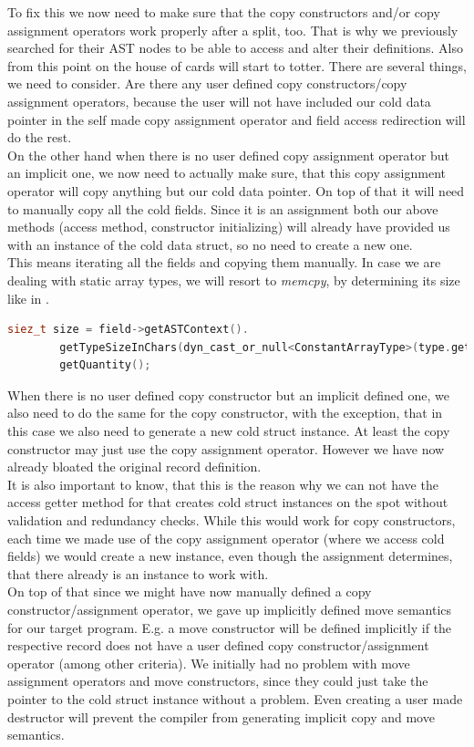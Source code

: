 To fix this we now need to make sure that the copy constructors and/or copy assignment operators work properly after a split, too. That is why we previously searched for their AST nodes to be able to access and alter their definitions. Also from this point on the house of cards will start to totter. There are several things, we need to consider. Are there any user defined copy constructors/copy assignment operators, because the user will not have included our cold data pointer in the self made copy assignment operator and field access redirection will do the rest.\\
On the other hand when there is no user defined copy assignment operator but an implicit one, we now need to actually make sure, that this copy assignment operator will copy anything but our cold data pointer. On top of that it will need to manually copy all the cold fields. Since it is an assignment both our above methods (access method, constructor initializing) will already have provided us with an instance of the cold data struct, so no need to create a new one.\\
This means iterating all the fields and copying them manually. In case we are dealing with static array types, we will resort to \textit{memcpy}, by determining its size like in .
\begin{lstlisting}[language=C++, name={Retrieving the size of a static array type through its AST node.}, label={memcpy_quant}]
	siez_t size = field->getASTContext().
		getTypeSizeInChars(dyn_cast_or_null<ConstantArrayType>(type.getTypePtr())).
		getQuantity();
\end{lstlisting}
When there is no user defined copy constructor but an implicit defined one, we also need to do the same for the copy constructor, with the exception, that in this case we also need to generate a new cold struct instance. At least the copy constructor may just use the copy assignment operator. However we have now already bloated the original record definition.\\
It is also important to know, that this is the reason why we can not have the access getter method for that creates cold struct instances on the spot without validation and redundancy checks. While this would work for copy constructors, each time we made use of the copy assignment operator (where we access cold fields) we would create a new instance, even though the assignment determines, that there already is an instance to work with.\\
On top of that since we might have now manually defined a copy constructor/assignment operator, we gave up implicitly defined move semantics for our target program. E.g. a move constructor will be defined implicitly if the respective record does not have a user defined copy constructor/assignment operator  (among other criteria). We initially had no problem with move assignment operators and move constructors, since they could just take the pointer to the cold struct instance without a problem. Even creating a user made destructor will prevent the compiler from generating implicit copy and move semantics.\\
